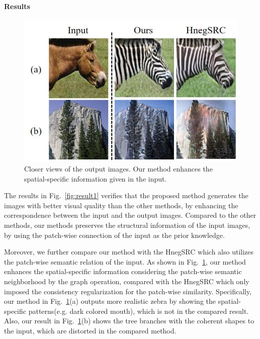 \documentclass[letterpaper]{article} %
\begin{document}
\paragraph{Results}
\begin{figure}[!t]
	\centering
	\includegraphics[width=0.85\columnwidth]{figs/spatial_specific_2.jpg}
	\caption{Closer views of the output images. Our method enhances the spatial-specific information given in the input.}
	\label{fig:spatial_specific}
\end{figure}


The results in Fig.~\ref{fig:result1} verifies that the proposed method generates the images with better visual quality than the other methods, by enhancing the correspondence between the input and the output images. Compared to the other methods, our methods preserves the structural information of the input images, by using the patch-wise connection of the input as the prior knowledge. 

Moreover, we further compare our method with the HnegSRC which also utilizes the patch-wise semantic relation of the input. As shown in Fig.~\ref{fig:spatial_specific}, our method enhances the spatial-specific information considering the patch-wise semantic neighborhood by the graph operation, compared with the HnegSRC which only imposed the consistency regularization for the patch-wise similarity. Specifically, our method in Fig.~\ref{fig:spatial_specific}(a) outputs more realistic zebra by showing the spatial-specific patterns(e.g. dark colored mouth), which is not in the compared result. Also, our result in Fig.~\ref{fig:spatial_specific}(b) shows the tree branches with the coherent shapes to the input, which are distorted in the compared method.  
\end{document}
